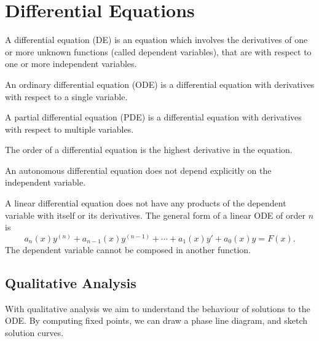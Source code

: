 \documentclass{article}
\begin{document}
\section{Differential Equations}
\begin{definition}
    A differential equation (DE) is an equation which involves the derivatives of
    one or more unknown functions (called dependent variables), that are with respect
    to one or more independent variables.
\end{definition}
\begin{definition}
    An ordinary differential equation (ODE) is a differential equation with
    derivatives with respect to a single variable.
\end{definition}
\begin{definition}
    A partial differential equation (PDE) is a differential equation with
    derivatives with respect to multiple variables.
\end{definition}
\begin{definition}
    The order of a differential equation is the highest derivative in the equation.
\end{definition}
\begin{definition}
    An autonomous differential equation does not depend explicitly on the independent variable.
\end{definition}
\begin{definition}
    A linear differential equation does not have any products of the dependent variable with itself
    or its derivatives. The general form of a linear ODE of order $n$ is
    \begin{equation*}
        a_n(x)y^{\left( n \right)} + a_{n-1}(x)y^{\left( n-1 \right)} + \cdots + a_1(x)y' + a_0(x)y = F(x).
    \end{equation*}
    The dependent variable cannot be composed in another function.
\end{definition}
\subsection{Qualitative Analysis}
With qualitative analysis we aim to understand the behaviour of solutions to the ODE.
By \linebreak computing fixed points, we can draw a phase line diagram, and sketch solution curves.
\end{document}
